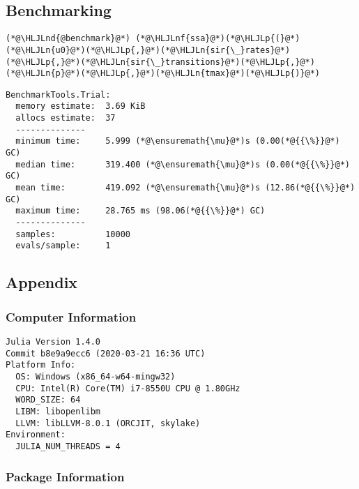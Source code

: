 \documentclass[12pt,a4paper]{article}
\newcommand{\HLJLn}[1]{#1}
\newcommand{\HLJLnd}[1]{\textcolor[RGB]{214,102,97}{#1}}
\newcommand{\HLJLnf}[1]{\textcolor[RGB]{66,102,213}{#1}}
\newcommand{\HLJLp}[1]{#1}
\begin{document}
\subsection{Benchmarking}

\begin{lstlisting}
(*@\HLJLnd{@benchmark}@*) (*@\HLJLnf{ssa}@*)(*@\HLJLp{(}@*)(*@\HLJLn{u0}@*)(*@\HLJLp{,}@*)(*@\HLJLn{sir{\_}rates}@*)(*@\HLJLp{,}@*)(*@\HLJLn{sir{\_}transitions}@*)(*@\HLJLp{,}@*)(*@\HLJLn{p}@*)(*@\HLJLp{,}@*)(*@\HLJLn{tmax}@*)(*@\HLJLp{)}@*)
\end{lstlisting}

\begin{lstlisting}
BenchmarkTools.Trial: 
  memory estimate:  3.69 KiB
  allocs estimate:  37
  --------------
  minimum time:     5.999 (*@\ensuremath{\mu}@*)s (0.00(*@{{\%}}@*) GC)
  median time:      319.400 (*@\ensuremath{\mu}@*)s (0.00(*@{{\%}}@*) GC)
  mean time:        419.092 (*@\ensuremath{\mu}@*)s (12.86(*@{{\%}}@*) GC)
  maximum time:     28.765 ms (98.06(*@{{\%}}@*) GC)
  --------------
  samples:          10000
  evals/sample:     1
\end{lstlisting}



\subsection{Appendix}

\subsubsection{Computer Information}

\begin{verbatim}
Julia Version 1.4.0
Commit b8e9a9ecc6 (2020-03-21 16:36 UTC)
Platform Info:
  OS: Windows (x86_64-w64-mingw32)
  CPU: Intel(R) Core(TM) i7-8550U CPU @ 1.80GHz
  WORD_SIZE: 64
  LIBM: libopenlibm
  LLVM: libLLVM-8.0.1 (ORCJIT, skylake)
Environment:
  JULIA_NUM_THREADS = 4

\end{verbatim}

\subsubsection{Package Information}
\end{document}
